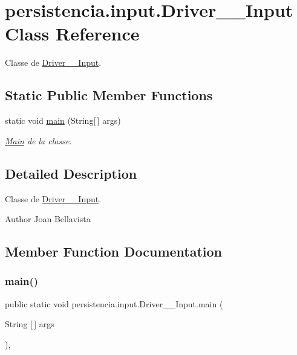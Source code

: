 \hypertarget{classpersistencia_1_1input_1_1Driver____Input}{}\section{persistencia.\+input.\+Driver\+\_\+\+\_\+\+Input Class Reference}
\label{classpersistencia_1_1input_1_1Driver____Input}


Classe de \hyperlink{classpersistencia_1_1input_1_1Driver____Input}{Driver\+\_\+\+\_\+\+Input}.  


\subsection*{Static Public Member Functions}
\begin{DoxyCompactItemize}
\item 
static void \hyperlink{classpersistencia_1_1input_1_1Driver____Input_a6a020d74862cb62628ab644253271179}{main} (String\mbox{[}$\,$\mbox{]} args)
\begin{DoxyCompactList}\small\item\em \hyperlink{classMain}{Main} de la classe. \end{DoxyCompactList}\end{DoxyCompactItemize}


\subsection{Detailed Description}
Classe de \hyperlink{classpersistencia_1_1input_1_1Driver____Input}{Driver\+\_\+\+\_\+\+Input}. 

\begin{DoxyAuthor}{Author}
Joan Bellavista 
\end{DoxyAuthor}


\subsection{Member Function Documentation}
\mbox{\label{classpersistencia_1_1input_1_1Driver____Input_a6a020d74862cb62628ab644253271179}} 
\subsubsection{\texorpdfstring{main()}{main()}}
{\footnotesize\ttfamily public static void persistencia.\+input.\+Driver\+\_\+\+\_\+\+Input.\+main (\begin{DoxyParamCaption}\item[{String \mbox{[}$\,$\mbox{]}}]{args }\end{DoxyParamCaption})\hspace{0.3cm}{\ttfamily [inline]}, {\ttfamily [static]}}



